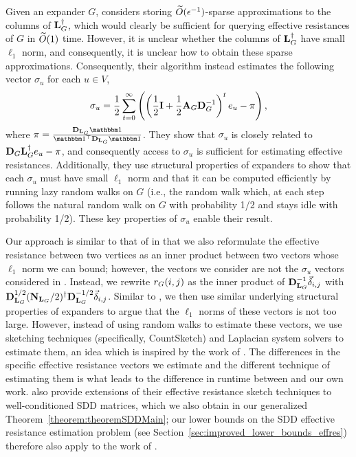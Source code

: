 Given an expander $G$, \cite{li2022new} considers storing $\widetilde{O}( {\epsilon^{-1}} )$-sparse approximations to the columns of $\mathbf{L}_{G}^\dagger$, which would clearly be sufficient for querying effective resistances of $G$ in $\widetilde{O}( {1} )$ time. However, it is unclear whether the columns of $\mathbf{L}_{G}^\dagger$ have small $\ell_1$ norm, and consequently, it is unclear how to obtain these sparse approximations. Consequently, their algorithm instead estimates the following vector $\sigma_u$ for each $u \in V$,
\begin{align*}
    \sigma_u = \frac{1}{2} \sum_{t=0}^\infty \left(\left(\frac{1}{2} \mathbf{I} + \frac{1}{2} {\mathbf{A}}_{G}{\mathbf{D}}_{G}^{-1} \right)^t e_u - \pi\right), 
\end{align*}
where $\pi = \frac{\diagonal{\laplacian{G}} \one}{\one^\top \diagonal{\laplacian{G}} \one}$. They show that $\sigma_u$ is closely related to ${\mathbf{D}}_{G} \mathbf{L}_{G}^\dagger e_u - \pi$, and consequently access to $\sigma_u$ is sufficient for estimating effective resistances. Additionally, they use structural properties of expanders to show that each $\sigma_u$ must have small $\ell_1$ norm and that it can be computed efficiently by running lazy random walks on $G$ (i.e., the random walk which, at each step follows the natural random walk on $G$ with probability 1/2 and stays idle with probability 1/2). These key properties of $\sigma_u$ enable their result. 

Our approach is similar to that of \cite{li2022new} in that we also reformulate the effective resistance between two vertices as an inner product between two vectors whose $\ell_1$ norm we can bound; however, the vectors we consider are not the $\sigma_u$ vectors considered in \cite{li2022new}. Instead, we rewrite ${r}_G({i,j})$ as the inner product of ${\mathbf{D}}_{\mathbf{L}_{G}}^{-1} \vec{\delta}_{i,j}$ with ${\mathbf{D}}_{\mathbf{L}_{G}}^{1/2}(\mathbf{N}_{\mathbf{L}_{G}}/2)^{\dagger} {\mathbf{D}}_{\mathbf{L}_{G}}^{-1/2} \vec{\delta}_{i,j}$. Similar to \cite{li2022new}, we then use similar underlying structural properties of expanders to argue that the $\ell_1$ norms of these vectors is not too large. However, instead of using random walks to estimate these vectors, we use sketching techniques (specifically, CountSketch) and Laplacian system solvers to estimate them, an idea which is inspired by the work of \cite{spielman2009graph}.  The differences in the specific effective resistance vectors we estimate 
and the different technique of estimating them is what leads to the difference in runtime between \cite{li2022new} and our own work. \cite{li2022new} also provide extensions of their effective resistance sketch techniques to well-conditioned SDD matrices, which we also obtain in our generalized Theorem~\ref{theorem:theoremSDDMain}; our lower bounds on the SDD effective resistance estimation problem (see Section~\ref{sec:improved_lower_bounds_effres}) therefore also apply to the work of \cite{li2022new}. 
